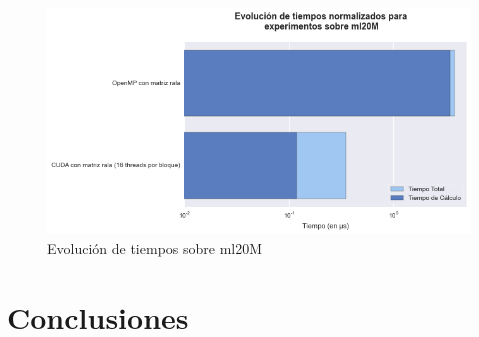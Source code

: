 \documentclass[11pt, a4paper]{article}
\begin{document}
  \begin{figure}[ht]
      \centering
      \includegraphics[width=\textwidth]{plots/ml20M.png}
      \caption{Evolución de tiempos sobre ml20M}\label{fig:ml20M}
  \end{figure}




  \section{Conclusiones}\label{sec:conclusiones}

  \clearpage
  
  
\end{document}
